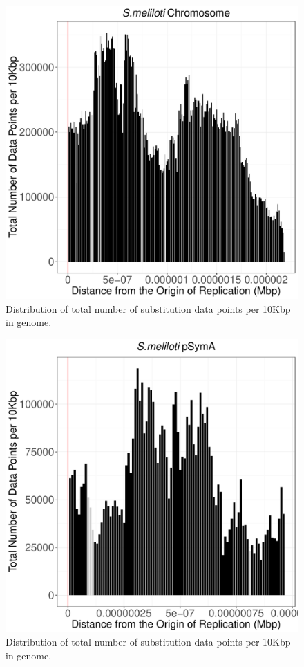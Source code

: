 \documentclass[12pt]{article}
\begin{document}
\begin{figure}
	\includegraphics[width=0.9\linewidth]{./sinoC_total_num_sites_graph.pdf}
	\caption{\label{fig:sinoC_tot_sites} Distribution of total number of substitution data points per 10Kbp in genome.}
\end{figure}


\begin{figure}
	\includegraphics[width=0.9\linewidth]{./pSymA_total_num_sites_graph.pdf}
	\caption{\label{fig:pa_tot_sites} Distribution of total number of substitution  data points per 10Kbp in genome.}
\end{figure}
\end{document}
